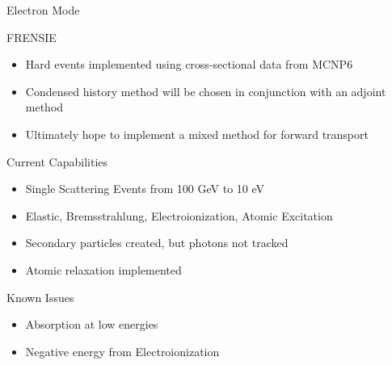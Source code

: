 \documentclass{beamer}
\begin{document}
\begin{frame}{Electron Mode}

  \begin{block}{FRENSIE}
    \begin{itemize}
      \item Hard events implemented using cross-sectional data from MCNP6
      \item Condensed history method will be chosen in conjunction with an adjoint method
      \item Ultimately hope to implement a mixed method for forward transport
    \end{itemize}    
  \end{block}
  
  \begin{block}{Current Capabilities}
    \begin{itemize}
      \item Single Scattering Events from 100 GeV to 10 eV
      \item Elastic, Bremsstrahlung, Electroionization, Atomic Excitation 
      \item Secondary particles created, but photons not tracked
      \item Atomic relaxation implemented
    \end{itemize}
  \end{block}
    
  \begin{block}{Known Issues}
    \begin{itemize}
      \item Absorption at low energies
      \item Negative energy from Electroionization
    \end{itemize}    
  \end{block}  

\end{frame}
\end{document}
